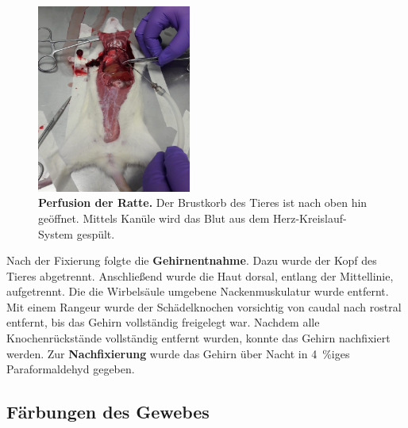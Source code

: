 \documentclass[12pt,a4paper,pdftex]{article}
\begin{document}
\begin{figure}[H]
    \centering
    \includegraphics[width=0.45\textwidth]{pictures/Bilder_Jule/Ratte/perfusion.png}
    \caption[Perfusion der Ratte]{\textbf{Perfusion der Ratte.} Der Brustkorb des Tieres ist nach oben hin geöffnet. Mittels Kanüle wird das Blut aus dem Herz-Kreislauf-System gespült.}
    \label{fig:perfusion}
\end{figure}

Nach der Fixierung folgte die \textbf{Gehirnentnahme}. Dazu wurde der Kopf des Tieres abgetrennt. Anschließend wurde die Haut dorsal, entlang der Mittellinie, aufgetrennt. Die die Wirbelsäule umgebene Nackenmuskulatur wurde entfernt. Mit einem Rangeur wurde der Schädelknochen vorsichtig von caudal nach rostral entfernt, bis das Gehirn vollständig freigelegt war. Nachdem alle Knochenrückstände vollständig entfernt wurden, konnte das Gehirn nachfixiert werden. Zur \textbf{Nachfixierung} wurde das Gehirn über Nacht in 4~\%iges Paraformaldehyd gegeben.

\subsection{Färbungen des Gewebes}
\end{document}
